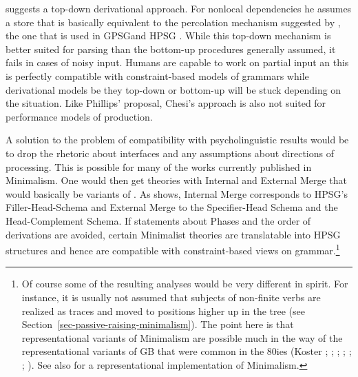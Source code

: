 \documentclass[output=paper]{langsci/langscibook}
\begin{document}
\citet{Chesi2015a-u} suggests a top-down derivational approach. For nonlocal
dependencies he assumes
a store that is basically equivalent to the percolation mechanism suggested by \citet{Gazdar81},
the one that is used in GPSG\indexgpsg and HPSG . While this top-down mechanism is
better suited for parsing than the bottom-up procedures generally assumed, it fails in cases of noisy
input. Humans are capable to work on partial input an this is perfectly compatible with
constraint-based models of grammars \citep[Section~3.2]{PS2001a} while derivational models be they
top-down or bottom-up will be stuck depending on the situation. Like Phillips' proposal, Chesi's
approach is also not suited for performance models of production.

A solution to the problem of compatibility with psycholinguistic results would be to drop the
rhetoric about interfaces and any assumptions about directions of processing. This is possible for
many of the works currently published in Minimalism. One would then get theories with Internal and
External Merge that would basically be variants of
 \parencites{BE95a}[Section~2.3]{MuellerUnifying}.
As \citet[--941]{MuellerUnifying} shows, Internal Merge corresponds to HPSG's Filler-Head-Schema and
External Merge to the Specifier-Head Schema and the
Head-Complement Schema. If statements about Phases and the order of
derivations are avoided, certain Minimalist theories are translatable into HPSG structures and hence
are compatible with constraint-based views on grammar.\footnote{
  Of course some of the resulting analyses would be very different in spirit. For instance, it is
  usually not assumed that subjects of non-finite verbs are realized as traces and moved to
  positions higher up in the tree (see Section~\ref{sec-passive-raising-minimalism}). The point here is that representational variants of Minimalism
  are possible much in the way of the representational variants of GB that were common in the 80ies
  (Koster \citeyear{Koster78b-u}; \citeyear[]{Koster87a-u};  %
\citealp{KT91a}; \citealp[Section~1.4]{Haider93a}; \citealp[]{Frey93a}; \citealp[--88, 177--178]{Lohnstein93a-u}; \citealp[]{FC94a}). See also  for a representational implementation of Minimalism.
}
\end{document}
